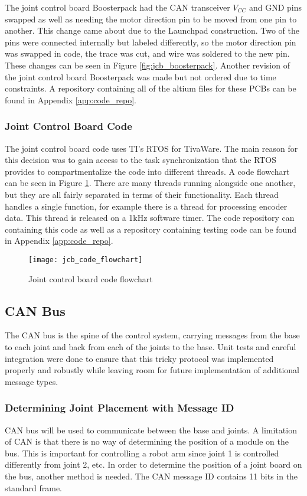 \noindent The joint control board Boosterpack had the CAN transceiver $V_{CC}$ and GND pins swapped as well as needing the motor direction pin to be moved from one pin to another. This change came about due to the Launchpad construction. Two of the pins were connected internally but labeled differently, so the motor direction pin was swapped in code, the trace was cut, and wire was soldered to the new pin. These changes can be seen in Figure \ref{fig:jcb_boosterpack}. Another revision of the joint control board Boosterpack was made but not ordered due to time constraints. A repository containing all of the altium files for these PCBs can be found in Appendix \ref{app:code_repo}.

\subsubsection{Joint Control Board Code}
The joint control board code uses TI's RTOS for TivaWare. The main reason for this decision was to gain access to the task synchronization that the RTOS provides to compartmentalize the code into different threads. A code flowchart can be seen in Figure \ref{fig:jcb_code_flowchart}. There are many threads running alongside one another, but they are all fairly separated in terms of their functionality. Each thread handles a single function, for example there is a thread for processing encoder data. This thread is released on a 1kHz software timer. The code repository can containing this code as well as a repository containing testing code can be found in Appendix \ref{app:code_repo}.

\begin{figure}[H]
	\centering
	\texttt{[image: jcb\_code\_flowchart]}
	\caption{Joint control board code flowchart}
	\label{fig:jcb_code_flowchart}
\end{figure}

\subsection{CAN Bus}
The CAN bus is the spine of the control system, carrying messages from the base to each joint and back from each of the joints to the base. Unit tests and careful integration were done to ensure that this tricky protocol was implemented properly and robustly while leaving room for future implementation of additional message types.

\subsubsection{Determining Joint Placement with Message ID}
CAN bus will be used to communicate between the base and joints. A limitation of CAN is that there is no way of determining the position of a module on the bus. This is important for controlling a robot arm since joint 1 is controlled differently from joint 2, etc. In order to determine the position of a joint board on the bus, another method is needed. The CAN message ID contains 11 bits in the standard frame.

